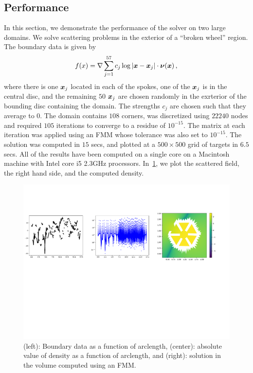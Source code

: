 \subsection{Performance}
In this section, we demonstrate the performance of the solver on two large domains. We solve scattering problems in the
exterior of a ``broken wheel'' region. The boundary data is given by
\begin{equation}
f(x) = \nabla  \sum_{j=1}^{57} c_{j} \log| \boldsymbol{x} - \boldsymbol{x}_{j}| \cdot \boldsymbol{\nu}(\boldsymbol{x}) \, , 
\end{equation}
where there is one $\boldsymbol{x}_{j}$ located in each of the spokes, one of the $\boldsymbol{x}_{j}$ is in the central disc, and the remaining $50$ $\boldsymbol{x}_{j}$ are chosen randomly in the exrterior of the bounding disc containing the domain. The strengths $c_{j}$ are chosen such that they average to $0$. The domain contains $108$ corners, was discretized using $22240$ nodes and required $105$ iterations to converge to a residue of $10^{-15}$. The matrix at each iteration was applied using an FMM whose tolerance was also set to $10^{-15}$. The solution was computed in $15$ secs, and plotted at a $500\times 500$ grid of targets in $6.5$ secs. All of the results have been computed on a single core on a Macintosh machine with Intel core i5 2.3GHz processors. In~\cref{fig:magnetron}, we plot the scattered field, the right hand side, and the computed density.

\begin{figure}
\begin{center}
\includegraphics[width=\linewidth]{media/magnetron}
\caption{(left): Boundary data as a function of arclength, (center): absolute value of density as a function of arclength, and 
(right): solution in the volume computed using an FMM.}
\label{fig:magnetron}
\end{center}
\end{figure}